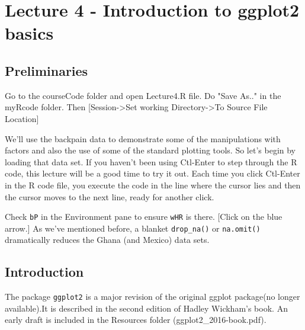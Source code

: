 \documentclass[titlepage]{book}\usepackage{knitr}
\begin{document}
\chapter{ Lecture 4 - Introduction to ggplot2 basics}

\author{Brian Williams $<$\href{mailto:bjw649@gmail.com}%
{bjw649@gmail.com}$>$}


\section{Preliminaries}

Go to the courseCode folder and open Lecture4.R file. Do "Save As.." in the myRcode folder.  
Then [Session->Set working Directory->To Source File Location]

We'll use the backpain data to demonstrate some of the manipulations with factors and also the use of some of the standard plotting tools. So let's begin by loading that data set. If you haven't been using Ctl-Enter to step through the R code, this lecture will be a good time to try it out. Each time you click Ctl-Enter in the R code file, you execute the code in the line where the cursor lies and then the cursor moves to the next line, ready for another click.

\begin{knitrout}
\color{fgcolor}\begin{kframe}
\begin{alltt}
\hlstd{(}\hlstd{)}
 \hlkwb{<-} 
\end{alltt}
\end{kframe}
\end{knitrout}


Check \texttt{bP} in the Environment pane to ensure \texttt{wHR} is there. [Click on the blue arrow.]
As we've mentioned before, a blanket \texttt{drop\_na()} or \texttt{na.omit()} dramatically reduces the Ghana (and Mexico) data sets.

\section{Introduction}

The package \texttt{ggplot2} is a major revision of the original ggplot package(no longer available).It is described in the second edition of Hadley Wickham's book. An early draft is included in the Resources folder (ggplot2\_2016-book.pdf).
\end{document}
